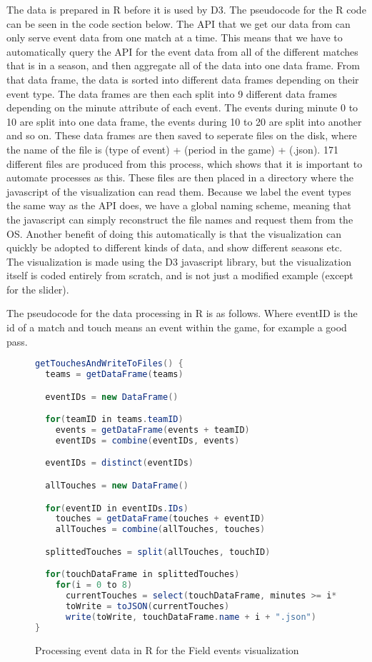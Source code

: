 \documentclass[Report.tex]{subfiles}
\begin{document}
The data is prepared in R before it is used by D3. The pseudocode for the R code can be seen in the code section below. The API that we get our data from can only serve event data from one match at a time. This means that we have to automatically query the API for the event data from all of the different matches that is in a season, and then aggregate all of the data into one data frame. From that data frame, the data is sorted into different data frames depending on their event type. The data frames are then each split into 9 different data frames depending on the minute attribute of each event. The events during minute 0 to 10 are split into one data frame, the events during 10 to 20 are split into another and so on. These data frames are then saved to seperate files on the disk, where the name of the file is (type of event) + (period in the game) + (.json). 171 different files are produced from this process, which shows that it is important to automate processes as this. These files are then placed in a directory where the javascript of the visualization can read them. Because we label the event types the same way as the API does, we have a global naming scheme, meaning that the javascript can simply reconstruct the file names and request them from the OS. Another benefit of doing this automatically is that the visualization can quickly be adopted to different kinds of data, and show different seasons etc.\\

\noindent The visualization is made using the D3 javascript library, but the visualization itself is coded entirely from scratch, and is not just a modified example (except for the slider).

The pseudocode for the data processing in R is as follows.
Where eventID is the id of a match and touch means an event within the game, for example a good pass.

\begin{figure}
\begin{lstlisting}[language=java]
getTouchesAndWriteToFiles() {
  teams = getDataFrame(teams)

  eventIDs = new DataFrame()

  for(teamID in teams.teamID)
    events = getDataFrame(events + teamID)
    eventIDs = combine(eventIDs, events)

  eventIDs = distinct(eventIDs)

  allTouches = new DataFrame()

  for(eventID in eventIDs.IDs)
    touches = getDataFrame(touches + eventID)
    allTouches = combine(allTouches, touches)

  splittedTouches = split(allTouches, touchID)

  for(touchDataFrame in splittedTouches)
    for(i = 0 to 8)
      currentTouches = select(touchDataFrame, minutes >= i*10 AND minutes < (i + 1)*10)
      toWrite = toJSON(currentTouches)
      write(toWrite, touchDataFrame.name + i + ".json")
}
\end{lstlisting}
\caption{Processing event data in R for the Field events visualization}
\end{figure}
\end{document}
